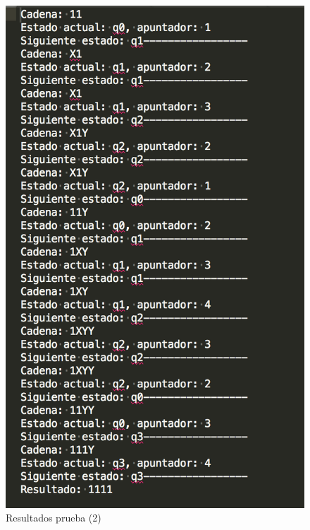 	\begin{figure}[H]
		\begin{center}
			\includegraphics[scale=.6]{img/prueba2.png}
			\caption{Resultados prueba (2)}
			\label{fig:maquin3}
		\end{center}
	\end{figure}

